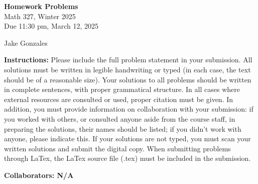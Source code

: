 \documentclass [10pt]{article}
\newcommand{\jg}[1]{{\color{blue} #1}}
\begin{document}
\begin{center}
{\bf Homework Problems}\\
Math 327, Winter 2025\\
Due 11:30 pm, March 12, 2025

\begin{center}
\jg{
    Jake Gonzales}
\end{center}


\end{center}
{\bf Instructions:} Please include the full problem statement in your submission.
All solutions must be written in legible handwriting
or typed (in each case, the text should be of a reasonable size). Your solutions to
all problems should be written in complete sentences, with proper grammatical
structure.
In all cases where external resources are consulted or used, proper citation must
be given. In addition,
you must provide information on collaboration with your submission: if you worked with others,
or consulted anyone aside from the course staff, in preparing the solutions, their
names should be
listed; if you didn't work with anyone, please indicate this.
If your solutions are not typed, you must scan your written solutions and submit
the digital copy. When submitting problems through LaTex, the LaTex source file
(.tex) must be included in the submission.


\jg{
\textbf{Collaborators: N/A }
}
\end{document}
